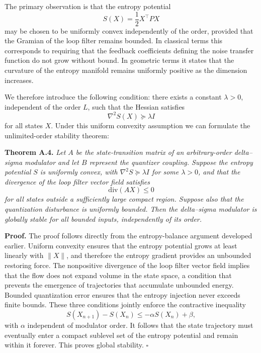 The primary observation is that the entropy potential
\[
S(X) = \frac{1}{2} X^\top P X
\]
may be chosen to be uniformly convex independently of the order, provided that the Gramian of the loop filter remains bounded. In classical terms this corresponds to requiring that the feedback coefficients defining the noise transfer function do not grow without bound. In geometric terms it states that the curvature of the entropy manifold remains uniformly positive as the dimension increases.

We therefore introduce the following condition: there exists a constant \(\lambda>0\), independent of the order \(L\), such that the Hessian satisfies
\[
\nabla^2 S(X) \succeq \lambda I
\]
for all states \(X\). Under this uniform convexity assumption we can formulate the unlimited-order stability theorem:

\medskip

\textbf{Theorem A.4.}
\emph{Let \(A\) be the state-transition matrix of an arbitrary-order delta–sigma modulator and let \(B\) represent the quantizer coupling. Suppose the entropy potential \(S\) is uniformly convex, with \(\nabla^2 S \succeq \lambda I\) for some \(\lambda>0\), and that the divergence of the loop filter vector field satisfies}
\[
\mathrm{div}(A X) \le 0
\]
\emph{for all states outside a sufficiently large compact region. Suppose also that the quantization disturbance is uniformly bounded. Then the delta–sigma modulator is globally stable for all bounded inputs, independently of its order.}

\medskip

\textbf{Proof.}
The proof follows directly from the entropy-balance argument developed earlier. Uniform convexity ensures that the entropy potential grows at least linearly with \(\|X\|\), and therefore the entropy gradient provides an unbounded restoring force. The nonpositive divergence of the loop filter vector field implies that the flow does not expand volume in the state space, a condition that prevents the emergence of trajectories that accumulate unbounded energy. Bounded quantization error ensures that the entropy injection never exceeds finite bounds. These three conditions jointly enforce the contractive inequality
\[
S(X_{n+1}) - S(X_n) \le -\alpha S(X_n) + \beta,
\]
with \(\alpha\) independent of modulator order. It follows that the state trajectory must eventually enter a compact sublevel set of the entropy potential and remain within it forever. This proves global stability. \(\square\)

\medskip

